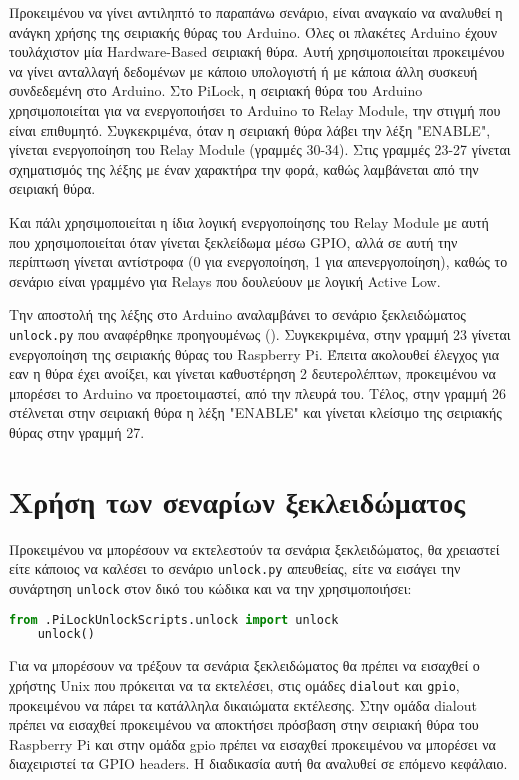 	Προκειμένου να γίνει αντιληπτό το παραπάνω σενάριο, είναι αναγκαίο να αναλυθεί η ανάγκη χρήσης της σειριακής θύρας του Arduino. Όλες οι πλακέτες Arduino έχουν τουλάχιστον μία Hardware-Based σειριακή θύρα. Αυτή χρησιμοποιείται προκειμένου να γίνει ανταλλαγή δεδομένων με κάποιο υπολογιστή ή με κάποια άλλη συσκευή συνδεδεμένη στο Arduino. Στο PiLock, η σειριακή θύρα του Arduino χρησιμοποιείται για να ενεργοποιήσει το Arduino το Relay Module, την στιγμή που είναι επιθυμητό. Συγκεκριμένα, όταν η σειριακή θύρα λάβει την λέξη "ENABLE", γίνεται ενεργοποίηση του Relay Module (γραμμές 30-34). Στις γραμμές 23-27 γίνεται σχηματισμός της λέξης με έναν χαρακτήρα την φορά, καθώς λαμβάνεται από την σειριακή θύρα.

	Και πάλι χρησιμοποιείται η ίδια λογική ενεργοποίησης του Relay Module με αυτή που χρησιμοποιείται όταν γίνεται ξεκλείδωμα μέσω GPIO, αλλά σε αυτή την περίπτωση γίνεται αντίστροφα (0 για ενεργοποίηση, 1 για απενεργοποίηση), καθώς το σενάριο είναι γραμμένο για Relays που δουλεύουν με λογική Active Low.

	Την αποστολή της λέξης στο Arduino αναλαμβάνει το σενάριο ξεκλειδώματος \verb|unlock.py| που αναφέρθηκε προηγουμένως (). Συγκεκριμένα, στην γραμμή 23 γίνεται ενεργοποίηση της σειριακής θύρας του Raspberry Pi. Έπειτα ακολουθεί έλεγχος για εαν η θύρα έχει ανοίξει, και γίνεται καθυστέρηση 2 δευτερολέπτων, προκειμένου να μπορέσει το Arduino να προετοιμαστεί, από την πλευρά του. Τέλος, στην γραμμή 26 στέλνεται στην σειριακή θύρα η λέξη "ENABLE" και γίνεται κλείσιμο της σειριακής θύρας στην γραμμή 27.

\section{Χρήση των σεναρίων ξεκλειδώματος}
	Προκειμένου να μπορέσουν να εκτελεστούν τα σενάρια ξεκλειδώματος, θα χρειαστεί είτε κάποιος να καλέσει το σενάριο \verb|unlock.py| απευθείας, είτε να εισάγει την συνάρτηση \verb|unlock| στον δικό του κώδικα και να την χρησιμοποιήσει:

	\begin{lstlisting}[language=Python]
	from .PiLockUnlockScripts.unlock import unlock
	unlock()\end{lstlisting}

	Για να μπορέσουν να τρέξουν τα σενάρια ξεκλειδώματος θα πρέπει να εισαχθεί ο χρήστης Unix που πρόκειται να τα εκτελέσει, στις ομάδες \verb|dialout| και \verb|gpio|, προκειμένου να πάρει τα κατάλληλα δικαιώματα εκτέλεσης. Στην ομάδα dialout πρέπει να εισαχθεί προκειμένου να αποκτήσει πρόσβαση στην σειριακή θύρα του Raspberry Pi και στην ομάδα gpio πρέπει να εισαχθεί προκειμένου να μπορέσει να διαχειριστεί τα GPIO headers. Η διαδικασία αυτή θα αναλυθεί σε επόμενο κεφάλαιο.